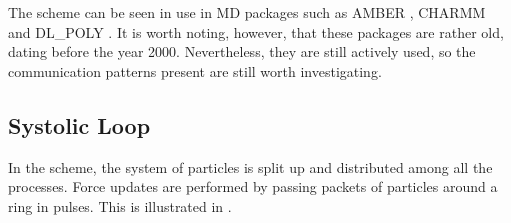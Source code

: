 The \replicateddata{} scheme can be seen in use in MD packages such as
AMBER \cite{pearlman1995amber}, CHARMM \cite{brooks1983charmm} and
DL\_POLY \cite{smith1996dlpoly2}.
%
It is worth noting, however, that these packages are rather old,
dating before the year 2000.
%
Nevertheless, they are still actively used, so the communication
patterns present are still worth investigating.




\subsection{Systolic Loop}
\label{sec:background:subsec:systolic_loop}

%
In the \systolicloop{} scheme, the system of particles is
split up and distributed among all the processes.
%
Force updates are performed by
passing packets of particles around a ring in pulses.
%
This is illustrated in .

